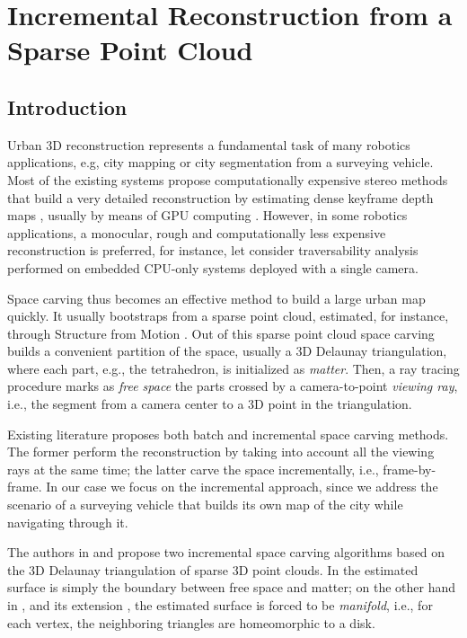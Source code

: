 \chapter{Incremental Reconstruction from a Sparse Point Cloud}










\section{Introduction}
\label{sec:intro_ch5}
Urban 3D reconstruction represents a fundamental task of many robotics applications, e.g, city mapping \cite{pollefeys_et_al_08} or city segmentation \cite{Hane_et_al_09} from a surveying vehicle.
Most of the existing systems propose computationally expensive stereo methods that build a very detailed reconstruction by estimating dense keyframe depth maps , usually by means of GPU computing \cite{pollefeys_et_al_08,Cornelis_et_al08}. 
However, in some robotics applications, a monocular, rough and computationally less expensive reconstruction is preferred,  for instance, let consider traversability analysis performed on embedded CPU-only systems deployed with a single camera.

Space carving \cite{Seitz_et_al06} thus becomes an effective method to build  a large urban map quickly. 
It usually bootstraps from a sparse point cloud, estimated, for instance, through Structure from Motion \cite{Snavely_et_al06}. 
Out of this sparse point cloud space carving builds a convenient partition of the space, usually a 3D Delaunay triangulation, where each part, e.g., the tetrahedron, is initialized as \emph{matter}.
Then, a ray tracing procedure marks as \emph{free space} the parts  crossed by a camera-to-point \emph{viewing ray}, i.e., the segment from a camera center to a 3D point in the triangulation. 

Existing literature proposes both batch \cite{Pan_et_al09} and incremental \cite{litvinov_lhuillier_13,Lovi_et_al_11} space carving methods.
The former perform the reconstruction by taking into account all the viewing rays at the same time; the latter carve the space incrementally, i.e., frame-by-frame.
In our case we focus on the incremental approach, since we address the scenario of a surveying vehicle that builds its own map of the city while navigating through it.

The authors in \cite{Lovi_et_al_11}  and \cite{litvinov_lhuillier_13} propose two incremental space carving algorithms based on the 3D Delaunay triangulation of sparse 3D point clouds. 
In \cite{Lovi_et_al_11} the estimated surface is simply the boundary between free space and matter; on the other hand in \cite{litvinov_lhuillier_13}, and its extension \cite{litvinov_Lhiuller14}, the estimated surface is forced to be \emph{manifold}, i.e., for each vertex, the neighboring triangles are homeomorphic to a disk. 

